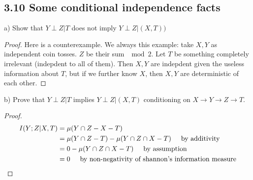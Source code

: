 \documentclass[../main.tex]{subfiles}
\begin{document}
 \subsection*{3.10 Some conditional independence facts}
 a) Show that $Y\perp Z|T$ does not imply $Y\perp Z | (X,T))$
 \begin{proof}
     Here is a counterexample. We always this example: take $X,Y$ as independent coin tosses. $Z$ be their sum $\mod 2$. Let $T$ be something completely irrelevant (indepdent to all of them). Then $X, Y$ are indepdent given the useless information about $T$, but if we further know $X$, then $X,Y$ are deterministic of each other.
 \end{proof}
 
 b) Prove that $Y\perp Z|T$ implies $Y \perp Z |(X,T)$ conditioning on $X\to Y\to Z\to T$.
 \begin{proof}
     \begin{align*}
         I(Y;Z|X,T) &= \mu(Y\cap Z -X -T)\\
         &=\mu(Y \cap Z - T) - \mu(Y\cap Z\cap X-T) \hspace{5mm}\text{by additivity}\\
         &=0-\mu(Y\cap Z\cap X-T)\hspace{5mm}\text{by assumption}\\
         &=0 \hspace{5mm}\text{by non-negativity of shannon's information measure}
     \end{align*}
 \end{proof}
\end{document}
